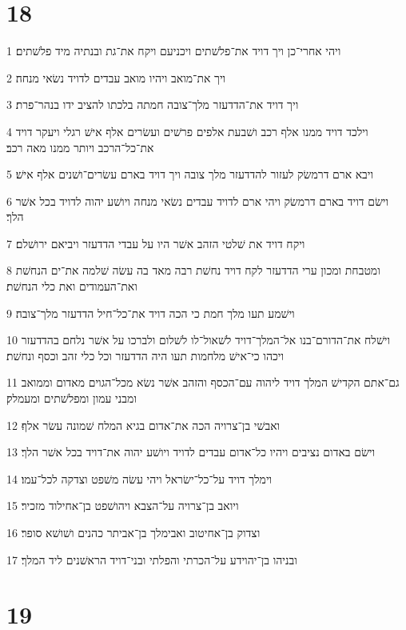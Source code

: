 \chapter{18}

\par 1 ויהי אחרי־כן ויך דויד את־פלשׁתים ויכניעם ויקח את־גת ובנתיה מיד פלשׁתים׃
\par 2 ויך את־מואב ויהיו מואב עבדים לדויד נשׂאי מנחה׃
\par 3 ויך דויד את־הדדעזר מלך־צובה חמתה בלכתו להציב ידו בנהר־פרת׃
\par 4 וילכד דויד ממנו אלף רכב ושׁבעת אלפים פרשׁים ועשׂרים אלף אישׁ רגלי ויעקר דויד את־כל־הרכב ויותר ממנו מאה רכב׃
\par 5 ויבא ארם דרמשׂק לעזור להדדעזר מלך צובה ויך דויד בארם עשׂרים־ושׁנים אלף אישׁ׃
\par 6 וישׂם דויד בארם דרמשׂק ויהי ארם לדויד עבדים נשׂאי מנחה ויושׁע יהוה לדויד בכל אשׁר הלך׃
\par 7 ויקח דויד את שׁלטי הזהב אשׁר היו על עבדי הדדעזר ויביאם ירושׁלם׃
\par 8 ומטבחת ומכון ערי הדדעזר לקח דויד נחשׁת רבה מאד בה עשׂה שׁלמה את־ים הנחשׁת ואת־העמודים ואת כלי הנחשׁת׃
\par 9 וישׁמע תעו מלך חמת כי הכה דויד את־כל־חיל הדדעזר מלך־צובה׃
\par 10 וישׁלח את־הדורם־בנו אל־המלך־דויד לשׁאול־לו לשׁלום ולברכו על אשׁר נלחם בהדדעזר ויכהו כי־אישׁ מלחמות תעו היה הדדעזר וכל כלי זהב וכסף ונחשׁת׃
\par 11 גם־אתם הקדישׁ המלך דויד ליהוה עם־הכסף והזהב אשׁר נשׂא מכל־הגוים מאדום וממואב ומבני עמון ומפלשׁתים ומעמלק׃
\par 12 ואבשׁי בן־צרויה הכה את־אדום בגיא המלח שׁמונה עשׂר אלף׃
\par 13 וישׂם באדום נציבים ויהיו כל־אדום עבדים לדויד ויושׁע יהוה את־דויד בכל אשׁר הלך׃
\par 14 וימלך דויד על־כל־ישׂראל ויהי עשׂה משׁפט וצדקה לכל־עמו׃
\par 15 ויואב בן־צרויה על־הצבא ויהושׁפט בן־אחילוד מזכיר׃
\par 16 וצדוק בן־אחיטוב ואבימלך בן־אביתר כהנים ושׁושׁא סופר׃
\par 17 ובניהו בן־יהוידע על־הכרתי והפלתי ובני־דויד הראשׁנים ליד המלך׃

\chapter{19}

